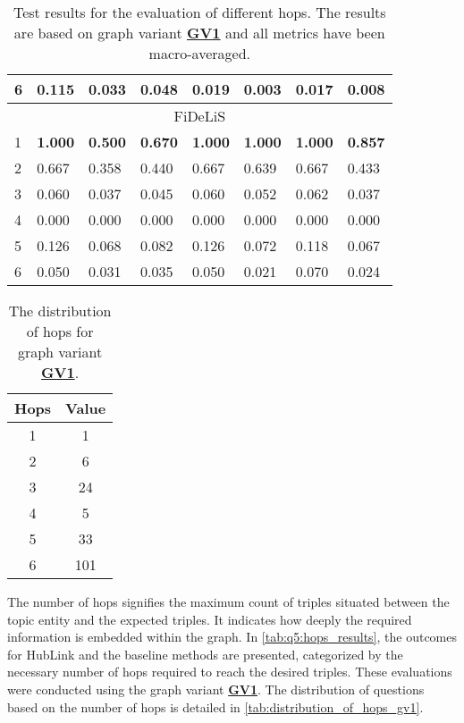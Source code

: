 \begin{table}[t]
\begin{tabular}{@{}llllllll@{}}
6 & 0.115 & 0.033 & 0.048 & \textbf{0.019} & \textbf{0.003} & \textbf{0.017} & 0.008 \\
\midrule
\multicolumn{8}{c}{FiDeLiS} \\
\midrule
1 & \textbf{1.000} & \textbf{0.500} & \textbf{0.670} & \textbf{1.000} & \textbf{1.000} & \textbf{1.000} & \textbf{0.857} \\
2 & 0.667 & 0.358 & 0.440 & 0.667 & 0.639 & 0.667 & 0.433 \\
3 & 0.060 & 0.037 & 0.045 & 0.060 & 0.052 & 0.062 & 0.037 \\
4 & 0.000 & 0.000 & 0.000 & 0.000 & 0.000 & 0.000 & 0.000 \\
5 & 0.126 & 0.068 & 0.082 & 0.126 & 0.072 & 0.118 & 0.067 \\
6 & 0.050 & 0.031 & 0.035 & 0.050 & 0.021 & 0.070 & 0.024 \\
\bottomrule
\end{tabular}%
\caption[Results on Retrieval Performance for Different Hops]{Test results for the evaluation of different hops. The results are based on graph variant \hyperref[enum:gv1]{\textbf{GV1}} and all metrics have been macro-averaged.}
\label{tab:q5:hops_results}
\end{table}


\begin{table}[t]
\centering
\begin{tabular}{cc}
\toprule
\textbf{Hops} & \textbf{Value} \\
\midrule
1 & 1 \\
2 & 6 \\
3 & 24 \\
4 & 5 \\
5 & 33 \\
6 & 101 \\
\bottomrule
\end{tabular}
\caption[Distribution of Hops on GV1]{The distribution of hops for graph variant \hyperref[enum:gv1]{\textbf{GV1}}.}
\label{tab:distribution_of_hops_gv1}
\end{table}

The number of hops signifies the maximum count of triples situated between the topic entity and the expected triples. It indicates how deeply the required information is embedded within the graph. In \autoref{tab:q5:hops_results}, the outcomes for HubLink and the baseline methods are presented, categorized by the necessary number of hops required to reach the desired triples. These evaluations were conducted using the graph variant \hyperref[enum:gv1]{\textbf{GV1}}. The distribution of questions based on the number of hops is detailed in \autoref{tab:distribution_of_hops_gv1}.

